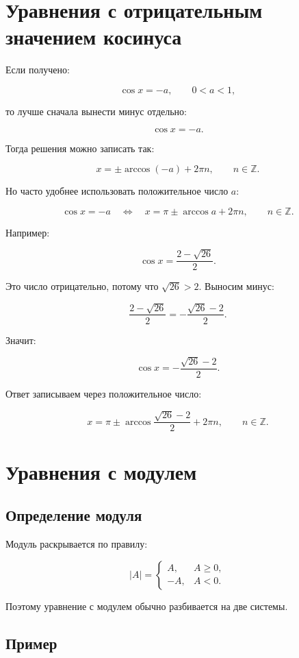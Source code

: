 \documentclass[a4paper,12pt]{article}
\newcommand{\Z}{\mathbb{Z}}
\begin{document}
\section{Уравнения с отрицательным значением косинуса}

Если получено:

\[
\cos x=-a,\qquad 0<a<1,
\]

то лучше сначала вынести минус отдельно:

\[
\cos x=-a.
\]

Тогда решения можно записать так:

\[
x=\pm\arccos(-a)+2\pi n,\qquad n\in\Z.
\]

Но часто удобнее использовать положительное число \(a\):

\[
\cos x=-a
\quad\Longleftrightarrow\quad
x=\pi\pm\arccos a+2\pi n,\qquad n\in\Z.
\]

Например:

\[
\cos x=\frac{2-\sqrt{26}}{2}.
\]

Это число отрицательно, потому что \(\sqrt{26}>2\). Выносим минус:

\[
\frac{2-\sqrt{26}}{2}
=
-\frac{\sqrt{26}-2}{2}.
\]

Значит:

\[
\cos x=-\frac{\sqrt{26}-2}{2}.
\]

Ответ записываем через положительное число:

\[
x=\pi\pm\arccos\frac{\sqrt{26}-2}{2}+2\pi n,\qquad n\in\Z.
\]

\section{Уравнения с модулем}

\subsection{Определение модуля}

Модуль раскрывается по правилу:

\[
|A|=
\begin{cases}
A, & A\ge0,\\
-A, & A<0.
\end{cases}
\]

Поэтому уравнение с модулем обычно разбивается на две системы.

\subsection{Пример}
\end{document}
